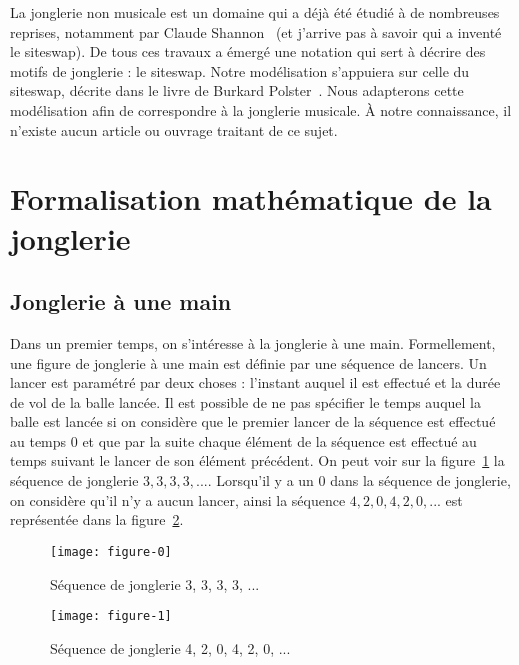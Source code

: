\documentclass[a4paper]{easychair}
\begin{document}
La jonglerie non musicale est un domaine qui a déjà été étudié à de nombreuses
reprises, notamment par Claude Shannon~\cite{shannon} (et j'arrive pas à savoir
qui a inventé le siteswap). De tous ces travaux a émergé une notation qui sert à
décrire des motifs de jonglerie : le siteswap. Notre modélisation s'appuiera sur
celle du siteswap, décrite dans le livre de Burkard Polster~\cite{polster}. Nous
adapterons cette modélisation afin de correspondre à la jonglerie musicale. À
notre connaissance, il n'existe aucun article ou ouvrage traitant de ce sujet.

\section{Formalisation mathématique de la jonglerie}
\subsection{Jonglerie à une main}
Dans un premier temps, on s'intéresse à la jonglerie à une main. Formellement,
une figure de jonglerie à une main est définie par une séquence de lancers. Un
lancer est paramétré par deux choses : l'instant auquel il est effectué et la
durée de vol de la balle lancée. Il est possible de ne pas spécifier le temps
auquel la balle est lancée si on considère que le premier lancer de la séquence
est effectué au temps $0$ et que par la suite chaque élément de la séquence est
effectué au temps suivant le lancer de son élément précédent. On peut voir sur
la figure~\ref{fig1} la séquence de jonglerie $3, 3, 3, 3, ...$. Lorsqu'il y a
un $0$ dans la séquence de jonglerie, on considère qu'il n'y a aucun lancer,
ainsi la séquence $4, 2, 0, 4, 2, 0, ...$ est représentée dans la
figure~\ref{fig2}.

\begin{figure}[!h]
  \centering
  \texttt{[image: figure-0]}

  \caption{Séquence de jonglerie 3, 3, 3, 3, ...}
  \label{fig1}
\end{figure}

\begin{figure}[!h]
  \centering
  \texttt{[image: figure-1]}

  \caption{Séquence de jonglerie 4, 2, 0, 4, 2, 0, ...}
  \label{fig2}
\end{figure}


\end{document}
